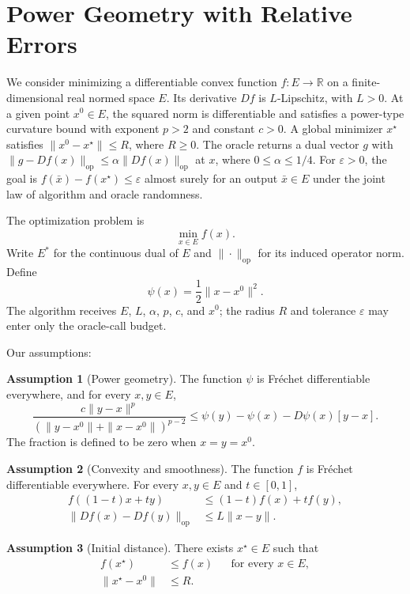 \documentclass[10pt]{article}
\theoremstyle{definition}
\newtheorem{assumption}{Assumption}
\begin{document}
\section*{Power Geometry with Relative Errors}
We consider minimizing a differentiable convex function $f:E\to\mathbb{R}$ on a finite-dimensional real normed space $E$. Its derivative $Df$ is $L$-Lipschitz, with $L>0$. At a given point $x^0\in E$, the squared norm is differentiable and satisfies a power-type curvature bound with exponent $p>2$ and constant $c>0$. A global minimizer $x^\star$ satisfies $\|x^0-x^\star\|\leq R$, where $R\geq0$. The oracle returns a dual vector $g$ with $\|g-Df(x)\|_{\mathrm{op}}\leq\alpha\|Df(x)\|_{\mathrm{op}}$ at $x$, where $0\leq\alpha\leq1/4$. For $\varepsilon>0$, the goal is $f(\bar{x})-f(x^\star)\leq\varepsilon$ almost surely for an output $\bar{x}\in E$ under the joint law of algorithm and oracle randomness.

The optimization problem is
\[
\min_{x\in E} f(x).
\]
Write $E^*$ for the continuous dual of $E$ and $\|\cdot\|_{\mathrm{op}}$ for its induced operator norm. Define
\[
\psi(x)=\frac{1}{2}\|x-x^0\|^2.
\]
The algorithm receives $E$, $L$, $\alpha$, $p$, $c$, and $x^0$; the radius $R$ and tolerance $\varepsilon$ may enter only the oracle-call budget.

Our assumptions:
\begin{assumption}[Power geometry]
The function $\psi$ is Fr\'echet differentiable everywhere, and for every $x,y\in E$,
\[
\frac{c\|y-x\|^p}
{(\|y-x^0\|+\|x-x^0\|)^{p-2}}
\leq \psi(y)-\psi(x)-D\psi(x)[y-x].
\]
The fraction is defined to be zero when $x=y=x^0$.
\end{assumption}

\begin{assumption}[Convexity and smoothness]
The function $f$ is Fr\'echet differentiable everywhere. For every $x,y\in E$ and $t\in[0,1]$,
\[
\begin{aligned}
f((1-t)x+ty)&\leq(1-t)f(x)+tf(y),\\
\|Df(x)-Df(y)\|_{\mathrm{op}}&\leq L\|x-y\|.
\end{aligned}
\]
\end{assumption}

\begin{assumption}[Initial distance]
There exists $x^\star\in E$ such that
\[
\begin{aligned}
f(x^\star)&\leq f(x) &&\text{for every }x\in E,\\
\|x^\star-x^0\|&\leq R.
\end{aligned}
\]
\end{assumption}
\end{document}
